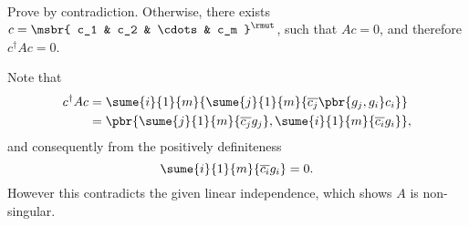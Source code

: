 \documentclass[english, nochinese]{../TeXTemplate/pkupaper}
\title{\titlemark}
\author{\authoring}
\begin{document}
\maketitle

\begin{thmquestion}
\
\begin{thmproof}
Prove by contradiction. Otherwise, there exists $ c = \msbr{ c_1 & c_2 & \cdots & c_m }^{\rmut} $, such that $ A c = 0 $, and therefore $ c^{\dag} A c = 0 $.

Note that
\begin{equation}
\begin{split}
c^{\dag} A c &= \sume{i}{1}{m}{\sume{j}{1}{m}{ \overline{c_j} \pbr{ g_j, g_i } c_i }} \\
&= \pbr{ \sume{j}{1}{m}{ \overline{c_j} g_j }, \sume{i}{1}{m}{ \overline{c_i} g_i } },
\end{split}
\end{equation}
and consequently from the positively definiteness
\begin{equation}
\sume{i}{1}{m}{ \overline{c_i} g_i } = 0.
\end{equation}
However this contradicts the given linear independence, which shows $A$ is non-singular.

\sqed
\end{thmproof}
\end{thmquestion}
\end{document}
